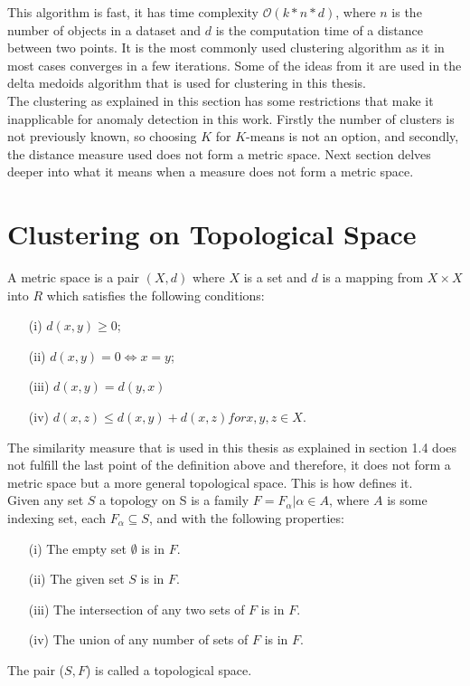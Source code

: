\documentclass[thesis=B,english]{FITthesis}[2012/10/20]
\begin{document}
This algorithm is fast, it has time complexity $\mathcal{O}(k*n*d)$, where $n$ is the number of objects in a dataset and $d$ is the computation time of a distance between two points.
It is the most commonly used clustering algorithm as it in most cases converges in a few iterations.
Some of the ideas from it are used in the delta medoids algorithm that is used for clustering in this thesis. \\

The clustering as explained in this section has some restrictions that make it inapplicable for anomaly detection in this work.
Firstly the number of clusters is not previously known, so choosing $K$ for $K$-means is not an option, and secondly, the distance measure used does not form a metric space.
Next section delves deeper into what it means when a measure does not form a metric space.

\section{Clustering on Topological Space}\label{sec:cluster_topo}

A metric space is a pair $(X, d)$ where $X$ is a set and $d$ is a mapping from $X \times X$ into $R$ which satisfies the following conditions:
\begin{enumerate}
    \item [(i)] $d(x, y) \geq 0$;
    \item [(ii)] $d(x, y) = 0 \iff x = y$;
    \item [(iii)] $d(x, y) = d(y, x)$
    \item [(iv)] $d(x, z) \leq d(x, y) + d(x, z) for x, y, z \in X$.
\end{enumerate}

The similarity measure that is used in this thesis as explained in section 1.4  does not fulfill the last point of the definition above and therefore, it does not form a metric space but a more general topological space. This is how \cite{stahl2014introduction} defines it. \\

Given any set $S$ a topology on S is a family $F ={F_{\alpha} | \alpha \in A}$, where $A$ is some indexing set, each $F_{\alpha}  \subseteq S$, and with the following properties:
\begin{enumerate}
    \item [(i)] The empty set $\emptyset$ is in $F$.
    \item [(ii)] The given set $S$ is in $F$.
    \item [(iii)] The intersection of any two sets of $F$ is in $F$.
    \item [(iv)] The union of any number of sets of $F$ is in $F$.
\end{enumerate}
The pair ($S, F$) is called a topological space. \\
\end{document}
